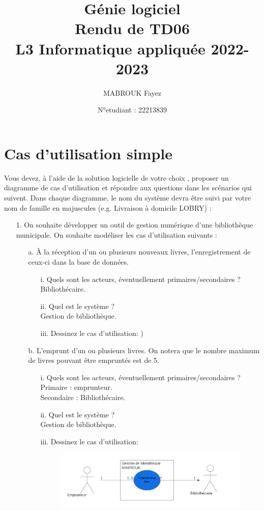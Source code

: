 \documentclass[12pt]{article}
\author{MABROUK Fayez}
\date{N°etudiant : 22213839}
\title{{\bf  Génie logiciel} \\
	Rendu de TD06\\
	{\small L3 Informatique appliquée 2022-2023} \\
	{\it \small }}
\begin{document}
	\maketitle
	\newpage
	\section{Cas d'utilisation simple}
	Vous devez, à l’aide de la solution logicielle de votre choix , proposer un diagramme de cas d’utilisation et répondre aux questions dans les
	scénarios qui suivent. Dans chaque diagramme, le nom du système devra être suivi par votre nom de
	famille en majuscules (e.g. Livraison à domicile LOBRY) :
	\begin{itemize}
		\item[1. ] On souhaite développer un outil de gestion numérique d’une bibliothèque municipale. On
		souhaite modéliser les cas d’utilisation suivants :
		\begin{itemize}
			\item[a. ] À la réception d’un ou plusieurs nouveaux livres, l’enregistrement de ceux-ci dans la
			base de données.
			\begin{itemize}
				\item[i. ] Quels sont les acteurs, éventuellement primaires/secondaires ?\\
				Bibliothécaire.
				\item[ii. ] Quel est le système ?\\
				Gestion de bibliothèque.
				\item[iii. ] Dessinez le cas d’utilisation: 
				\right) 
			\end{itemize}
		\item[b. ] L’emprunt d’un ou plusieurs livres. On notera que le nombre maximum de livres
		pouvant être empruntés est de 5.
		\begin{itemize}
			\item[i. ] Quels sont les acteurs, éventuellement primaires/secondaires ?\\
			Primaire : emprunteur.\\
			Secondaire : Bibliothécaire.
			\item[ii. ] Quel est le système ?\\
			Gestion de bibliothèque.
			\item[iii. ] Dessinez le cas d’utilisation:
			\begin{figure}[!hbtp]
				\includegraphics[scale=0.75]{capture2.PNG}
			\end{figure}
			

\end{itemize}
\end{itemize}
\end{itemize}
\end{document}
